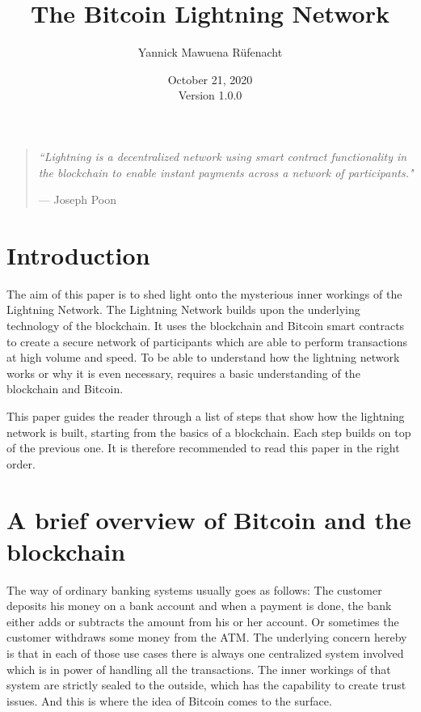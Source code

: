 \documentclass[a4paper, 12pt]{report}
\begin{document}
\title{\Large{\textbf{The Bitcoin Lightning Network}}}
\author{Yannick Mawuena Rüfenacht}
\date{October 21, 2020\\Version 1.0.0}
\maketitle

\begin{quote}
\vspace*{\fill}
\textit{``Lightning is a decentralized network using smart contract functionality in the blockchain to enable instant payments across a network of participants."}
\par\raggedleft--- \textup{Joseph Poon}
\vspace*{\fill}
\end{quote}

\tableofcontents
\pagebreak

\setlength{\parskip}{1em}
\setlength{\parindent}{0em}

\chapter{Introduction}
\par The aim of this paper is to shed light onto the mysterious inner workings of the Lightning Network. The Lightning Network builds upon the underlying technology of the blockchain. It uses the blockchain and Bitcoin smart contracts to create a secure network of participants which are able to perform transactions at high volume and speed. To be able to understand how the lightning network works or why it is even necessary, requires a basic understanding of the blockchain and Bitcoin.
\par This paper guides the reader through a list of steps that show how the lightning network is built, starting from the basics of a blockchain. Each step builds on top of the previous one. It is therefore recommended to read this paper in the right order.

\chapter{A brief overview of Bitcoin and the blockchain}
\par The way of ordinary banking systems usually goes as follows: The customer deposits his money on a bank account and when a payment is done, the bank either adds or subtracts the amount from his or her account. Or sometimes the customer withdraws some money from the ATM. The underlying concern hereby is that in each of those use cases there is always one centralized system involved which is in power of handling all the transactions. The inner workings of that system are strictly sealed to the outside, which has the capability to create trust issues. And this is where the idea of Bitcoin comes to the surface.
\end{document}
